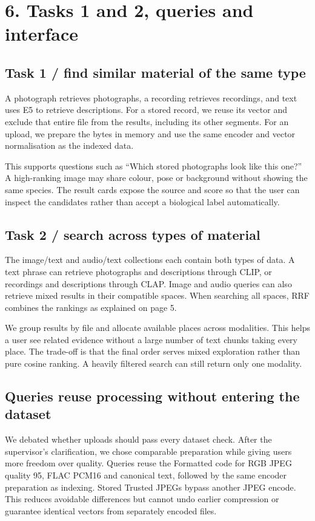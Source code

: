 \documentclass[10pt,a4paper]{article}
\begin{document}
\clearpage
\section*{6. Tasks 1 and 2, queries and interface}
\subsection*{Task 1 / find similar material of the same type}
A photograph retrieves photographs, a recording retrieves recordings, and text uses E5 to retrieve descriptions. For a stored record, we reuse its vector and exclude that entire file from the results, including its other segments. For an upload, we prepare the bytes in memory and use the same encoder and vector normalisation as the indexed data.

This supports questions such as ``Which stored photographs look like this one?'' A high-ranking image may share colour, pose or background without showing the same species. The result cards expose the source and score so that the user can inspect the candidates rather than accept a biological label automatically.

\subsection*{Task 2 / search across types of material}
The image/text and audio/text collections each contain both types of data. A text phrase can retrieve photographs and descriptions through CLIP, or recordings and descriptions through CLAP. Image and audio queries can also retrieve mixed results in their compatible spaces. When searching all spaces, RRF combines the rankings as explained on page 5.

We group results by file and allocate available places across modalities. This helps a user see related evidence without a large number of text chunks taking every place. The trade-off is that the final order serves mixed exploration rather than pure cosine ranking. A heavily filtered search can still return only one modality.

\subsection*{Queries reuse processing without entering the dataset}
We debated whether uploads should pass every dataset check. After the supervisor's clarification, we chose comparable preparation while giving users more freedom over quality. Queries reuse the Formatted code for RGB JPEG quality 95, FLAC PCM16 and canonical text, followed by the same encoder preparation as indexing. Stored Trusted JPEGs bypass another JPEG encode. This reduces avoidable differences but cannot undo earlier compression or guarantee identical vectors from separately encoded files.
\end{document}
